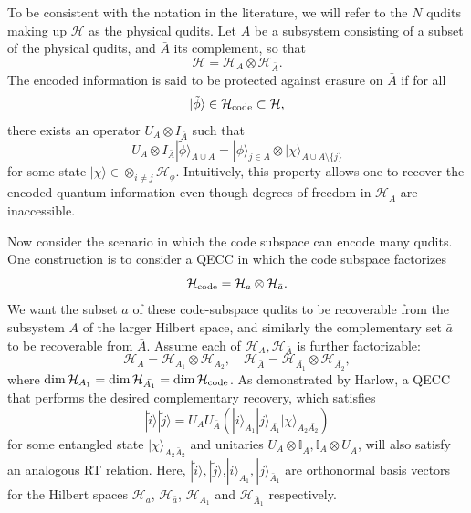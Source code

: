\documentclass[%
12pt,preprint,
nofootinbib,
amsmath,amssymb,
aps,
prd,
showpacs,
superscriptaddress
]{revtex4-2}
\begin{document}
To be consistent with the notation in the literature, we will refer to the $N$ qudits making up $\mathcal{H}$ as the physical qudits. 
Let $A$ be a subsystem consisting of a subset of the physical qudits, and $\bar{A}$ its complement, so that 
\begin{equation}
\mathcal{H}=\mathcal{H}_{A}\otimes\mathcal{H}_{\bar{A}}.  
\end{equation}
The encoded information is said to be protected against erasure on $\bar{A}$ if for all 
\begin{equation}
|\tilde{\phi}\rangle\in \mathcal{H}_{\rm code}\subset\mathcal{H},
\end{equation} 
there exists an operator $U_{A}\otimes I_{\bar{A}}$ such that 
\begin{equation}
 U_{A}\otimes I_{\bar{A}}|\tilde{\phi}\rangle_{A\cup\bar{A}} = |\phi\rangle_{j\in A} \otimes|\chi\rangle_{A\cup\bar{A}\setminus\{j\}}
\end{equation}
for some state $|\chi\rangle \in \otimes_{i\neq j}\mathcal{H_\phi}$.
Intuitively, this property allows one to recover the encoded quantum information even though degrees of freedom in $\mathcal{H}_{\bar{A}}$ are inaccessible.

Now consider the scenario in which the code subspace can encode many qudits. One construction is to consider a QECC in which the code subspace factorizes
\begin{equation}
\mathcal{H}_{\rm code}=\mathcal{H}_a\otimes\mathcal{H}_{\bar{a}}.
\end{equation} 
We want the subset $a$ of these code-subspace qudits to be recoverable from the subsystem $A$ of the larger Hilbert space, and similarly the complementary set $\bar{a}$ to be recoverable from $\bar{A}$. Assume each of $\mathcal{H}_{A}, \mathcal{H}_{\bar{A}}$ is further factorizable: 
\begin{equation}
\mathcal{H}_A=\mathcal{H}_{A_1}\otimes \mathcal{H}_{A_2}, \quad \mathcal{H}_{\bar{A}}=\mathcal{H}_{\bar{A_1}}\otimes \mathcal{H}_{\bar{A_2}}, 
\end{equation}
where $\dim \mathcal{H}_{A_1} = \dim\mathcal{H}_{\bar{A_1}} = \dim \mathcal{H}_{\rm code}$. 
As demonstrated by Harlow, a QECC that performs the desired complementary recovery, which satisfies  
\begin{equation}
 |\tilde{i}\rangle| \tilde{j} \rangle = U_{A} U_{\bar{A}}(|i\rangle_{A_1}|j\rangle_{\bar{A_1}}|\chi\rangle_{A_2\bar{A_2}})
\end{equation}
for some entangled state $|\chi\rangle_{A_2\bar{A}_2}$ and unitaries $U_A\otimes \mathbb{I}_{\bar{A}}, \mathbb{I}_{A}\otimes U_{\bar{A}}$, will also satisfy an analogous RT relation. 
Here, $|\tilde{i}\rangle, |\tilde{j}\rangle$,$|i\rangle_{A_1}, |j\rangle_{\bar{A}_1}$ are orthonormal basis vectors for the Hilbert spaces $\mathcal{H}_{a}$, $\mathcal{H}_{\bar{a}}$, $\mathcal{H}_{A_1}$ and $\mathcal{H}_{\bar{A}_1}$ respectively. 
\end{document}
